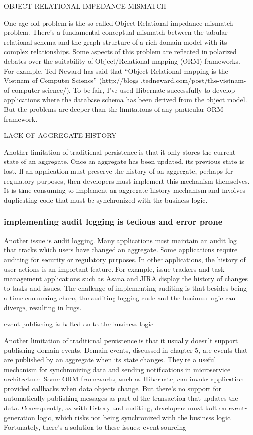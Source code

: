 OBJECT-RELATIONAL IMPEDANCE MISMATCH

One age-old problem is the so-called Object-Relational impedance mismatch problem.
There’s a fundamental conceptual mismatch between the tabular relational schema
and the graph structure of a rich domain model with its complex relationships.
Some aspects of this problem are reflected in polarized debates over the suitability of
Object/Relational mapping (ORM) frameworks. For example, Ted Neward has said
that “Object-Relational mapping is the Vietnam of Computer Science” (http://blogs
.tedneward.com/post/the-vietnam-of-computer-science/). To be fair, I’ve used
Hibernate successfully to develop applications where the database schema has been
derived from the object model. But the problems are deeper than the limitations of
any particular ORM framework. 

LACK OF AGGREGATE HISTORY

Another limitation of traditional persistence is that it only stores the current state of
an aggregate. Once an aggregate has been updated, its previous state is lost. If an
application must preserve the history of an aggregate, perhaps for regulatory purposes, then developers must implement this mechanism themselves. It is time consuming to implement an aggregate history mechanism and involves duplicating code
that must be synchronized with the business logic.

\subsubsection{implementing audit logging is tedious and error prone}

Another issue is audit logging. Many applications must maintain an audit log that
tracks which users have changed an aggregate. Some applications require auditing for
security or regulatory purposes. In other applications, the history of user actions is an
important feature. For example, issue trackers and task-management applications
such as Asana and JIRA display the history of changes to tasks and issues. The challenge of implementing auditing is that besides being a time-consuming chore, the
auditing logging code and the business logic can diverge, resulting in bugs.

event publishing is bolted on to the business logic

Another limitation of traditional persistence is that it usually doesn’t support publishing
domain events. Domain events, discussed in chapter 5, are events that are published by
an aggregate when its state changes. They’re a useful mechanism for synchronizing data
and sending notifications in microservice architecture. Some ORM frameworks, such
as Hibernate, can invoke application-provided callbacks when data objects change.
But there’s no support for automatically publishing messages as part of the transaction that updates the data. Consequently, as with history and auditing, developers
must bolt on event-generation logic, which risks not being synchronized with the business logic. Fortunately, there’s a solution to these issues: event sourcing

